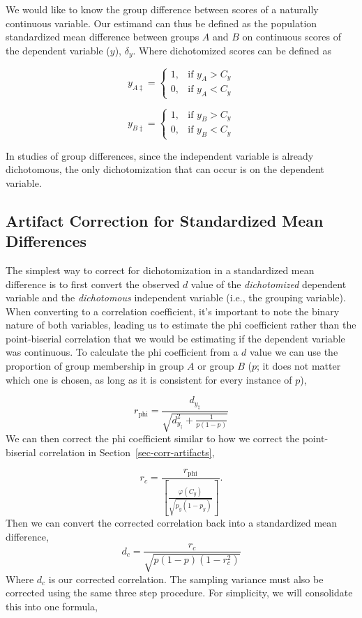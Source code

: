 \documentclass[
  letterpaper,
  DIV=11,
  numbers=noendperiod]{scrreprt}
\begin{document}
We would like to know the group difference between scores of a naturally
continuous variable. Our estimand can thus be defined as the population
standardized mean difference between groups \(A\) and \(B\) on
continuous scores of the dependent variable (\(y\)), \(\delta_{y}\).
Where dichotomized scores can be defined as

\[
 y_{A\ddagger}= 
\begin{cases}
    1,& \text{if } y_A>C_y\\
    0,& \text{if } y_A<C_y
\end{cases}
\]

\[
 y_{B\ddagger}= 
\begin{cases}
    1,& \text{if } y_B>C_y\\
    0,& \text{if } y_B<C_y
\end{cases}
\]

In studies of group differences, since the independent variable is
already dichotomous, the only dichotomization that can occur is on the
dependent variable.

\hypertarget{sec-corr-smd}{%
\subsection{Artifact Correction for Standardized Mean
Differences}\label{sec-corr-smd}}

The simplest way to correct for dichotomization in a standardized mean
difference is to first convert the observed \(d\) value of the
\emph{dichotomized} dependent variable and the \emph{dichotomous}
independent variable (i.e., the grouping variable). When converting to a
correlation coefficient, it's important to note the binary nature of
both variables, leading us to estimate the phi coefficient rather than
the point-biserial correlation that we would be estimating if the
dependent variable was continuous. To calculate the phi coefficient from
a \(d\) value we can use the proportion of group membership in group
\(A\) or group \(B\) (\(p\); it does not matter which one is chosen, as
long as it is consistent for every instance of \(p\)),

\[
r_{\text{phi}} = \frac{d_{y_\ddagger}}{\sqrt{d_{y_\ddagger}^2+\frac{1}{p(1-p)}}}
\] We can then correct the phi coefficient similar to how we correct the
point-biserial correlation in Section~\ref{sec-corr-artifacts},

\[
r_c = \frac{r_{\text{phi}}}{\left[\frac{\varphi(C_y)}{\sqrt{p_y (1-p_y)}}\right]}.
\] Then we can convert the corrected correlation back into a
standardized mean difference, \[
d_c = \frac{r_c}{\sqrt{p\left(1-p\right)\left(1-r_c^2\right)}}
\] Where \(d_c\) is our corrected correlation. The sampling variance
must also be corrected using the same three step procedure. For
simplicity, we will consolidate this into one formula,
\end{document}
